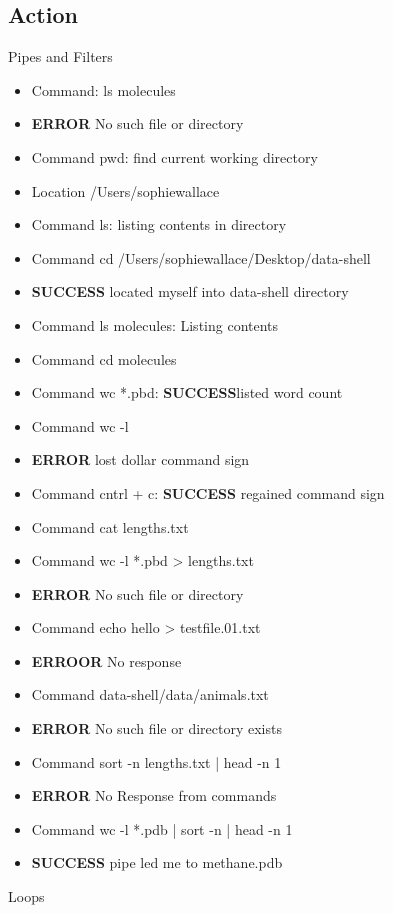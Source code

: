 \documentclass{article}
\begin{document}
\subsection{Action}
Pipes and Filters
\begin{itemize}
\item Command: ls molecules
\item \textbf{ERROR} No such file or directory
\item Command pwd: find current working directory
\item Location /Users/sophiewallace
\item Command ls: listing contents in directory
\item Command cd /Users/sophiewallace/Desktop/data-shell
\item \textbf{SUCCESS} located myself into data-shell directory
\item Command ls molecules: Listing contents
\item Command cd molecules
\item Command wc *.pbd: \textbf{SUCCESS}listed word count 
\item Command wc -l 
\item \textbf{ERROR} lost dollar command sign
\item Command cntrl + c:  \textbf{SUCCESS} regained command sign
\item Command cat lengths.txt
\item Command wc -l *.pbd > lengths.txt 
\item \textbf{ERROR} No such file or directory
\item Command echo hello > testfile.01.txt
\item \textbf{ERROOR} No response
\item Command data-shell/data/animals.txt
\item \textbf{ERROR} No such file or directory exists
\item Command sort -n lengths.txt | head -n 1
\item \textbf{ERROR} No Response from commands
\item Command wc -l *.pdb | sort -n | head -n 1
\item \textbf{SUCCESS} pipe led me to methane.pdb
\end{itemize}
Loops
\end{document}
